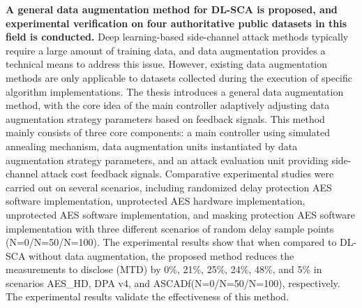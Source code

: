 \textbf{A general data augmentation method for DL-SCA is proposed, and experimental verification on four authoritative public datasets in this field is conducted.} Deep learning-based side-channel attack methods typically require a large amount of training data, and data augmentation provides a technical means to address this issue. However, existing data augmentation methods are only applicable to datasets collected during the execution of specific algorithm implementations. The thesis introduces a general data augmentation method, with the core idea of the main controller adaptively adjusting data augmentation strategy parameters based on feedback signals. This method mainly consists of three core components: a main controller using simulated annealing mechanism, data augmentation units instantiated by data augmentation strategy parameters, and an attack evaluation unit providing side-channel attack cost feedback signals. Comparative experimental studies were carried out on several scenarios, including randomized delay protection AES software implementation, unprotected AES hardware implementation, unprotected AES software implementation, and masking protection AES software implementation with three different scenarios of random delay sample points (N=0/N=50/N=100). %
The experimental results show that when compared to DL-SCA without data augmentation, the proposed method reduces the measurements to disclose (MTD) by 0\%, 21\%, 25\%, 24\%, 48\%, and 5\% in scenarios AES\_HD, DPA v4, and ASCADf(N=0/N=50/N=100), respectively. The experimental results validate the effectiveness of this method.

